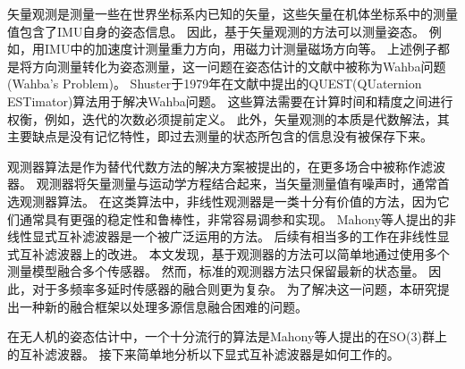 \documentclass[
  type=master
]{gdutthesis}
\begin{document}
矢量观测是测量一些在世界坐标系内已知的矢量，这些矢量在机体坐标系中的测量值包含了IMU自身的姿态信息。
因此，基于矢量观测的方法可以测量姿态。
例如，用IMU中的加速度计测量重力方向，用磁力计测量磁场方向等。
上述例子都是将方向测量转化为姿态测量，这一问题在姿态估计的文献中被称为Wahba问题(Wahba's Problem)\cite{wahba1965least}。
Shuster于1979年在文献\parencite{shuster1981three}中提出的QUEST(QUaternion ESTimator)算法用于解决Wahba问题。
这些算法需要在计算时间和精度之间进行权衡，例如，迭代的次数必须提前定义。
此外，矢量观测的本质是代数解法，其主要缺点是没有记忆特性，即过去测量的状态所包含的信息没有被保存下来。

观测器算法是作为替代代数方法的解决方案被提出的，在更多场合中被称作滤波器。
观测器将矢量测量与运动学方程结合起来，当矢量测量值有噪声时，通常首选观测器算法。
在这类算法中，非线性观测器是一类十分有价值的方法，因为它们通常具有更强的稳定性和鲁棒性，非常容易调参和实现。
Mahony等人提出的非线性显式互补滤波器是一个被广泛运用的方法\cite{mahony2008nonlinear}。
后续有相当多的工作在非线性显式互补滤波器上的改进\cite{hua2010attitude,khosravian2016state}。
本文发现，基于观测器的方法可以简单地通过使用多个测量模型融合多个传感器。
然而，标准的观测器方法只保留最新的状态量。
因此，对于多频率多延时传感器的融合则更为复杂。
为了解决这一问题，本研究提出一种新的融合框架以处理多源信息融合困难的问题。

在无人机的姿态估计中，一个十分流行的算法是Mahony等人提出的在SO(3)群上的互补滤波器\cite{mahony2008nonlinear}。
接下来简单地分析以下显式互补滤波器是如何工作的。
\end{document}
